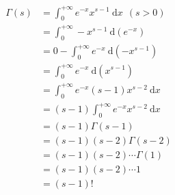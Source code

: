 \documentclass{article}
\begin{document}
	\large
	\setlength{\baselineskip}{3em}
	
	\renewcommand{\d}[1][x]{\ \text{d}#1}
	
	\begin{align*}
		\Gamma(s) & = \int_{0}^{+\infty} e^{-x} x^{s-1} \d \ \ (s > 0)
		\\
		& = \int_{0}^{+\infty} -x^{s-1} \d[(e^{-x})]
		\\
		& = 0 - \int_{0}^{+\infty} e^{-x} \d[(-x^{s-1})]
		\\
		& = \int_{0}^{+\infty} e^{-x} \d[(x^{s-1})]
		\\
		& = \int_{0}^{+\infty} e^{-x} (s - 1) x^{s-2} \d
		\\
		& = (s - 1) \int_{0}^{+\infty} e^{-x} x^{s-2} \d
		\\
		& = (s - 1) \Gamma(s - 1)
		\\
		& = (s - 1) (s - 2) \Gamma(s - 2)
		\\
		& = (s - 1) (s - 2) \cdots \Gamma(1)
		\\
		& = (s - 1) (s - 2) \cdots 1
		\\
		& = (s - 1)!
	\end{align*}
\end{document}
